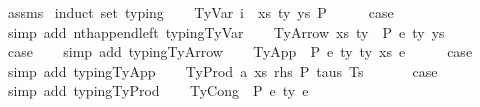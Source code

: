 \begin{isabellebody}
%
\isadelimproof
%
\endisadelimproof
%
\isatagproof
{}\isamarkupfalse%
\ assms\isanewline
{}\isamarkupfalse%
\ {\isacharparenleft}{\kern0pt}induct\ set{\isacharcolon}{\kern0pt}\ typing{\isacharparenright}{\kern0pt}\isanewline
\ \ \isamarkupfalse%
\ {\isacharparenleft}{\kern0pt}TyVar\ i\ {\isasymGamma}\ xs\ ty\ ys\ P{\isacharparenright}{\kern0pt}\isanewline
\ \ \isamarkupfalse%
\ \isamarkupfalse%
\ {\isacharquery}{\kern0pt}case\isanewline
\ \ \isamarkupfalse%
\ {\isacharparenleft}{\kern0pt}simp\ add{\isacharcolon}{\kern0pt}\ nth{\isacharunderscore}{\kern0pt}append{\isacharunderscore}{\kern0pt}left\ typing{\isachardot}{\kern0pt}TyVar{\isacharparenright}{\kern0pt}\isanewline
{}\isamarkupfalse%
\isanewline
\ \ \isamarkupfalse%
\ {\isacharparenleft}{\kern0pt}TyArrow\ xs\ ty{}\ {\isasymGamma}\ P\ e\ ty{}\ ys{\isacharparenright}{\kern0pt}\isanewline
\ \ \isamarkupfalse%
\ \isamarkupfalse%
\ {\isacharquery}{\kern0pt}case\isanewline
\ \ \isamarkupfalse%
\ {\isacharparenleft}{\kern0pt}simp\ add{\isacharcolon}{\kern0pt}\ typing{\isachardot}{\kern0pt}TyArrow{\isacharparenright}{\kern0pt}\isanewline
{}\isamarkupfalse%
\isanewline
\ \ \isamarkupfalse%
\ {\isacharparenleft}{\kern0pt}TyApp\ {\isasymGamma}\ P\ e{}\ ty{}\ ty{}\ xs\ e{}{\isacharparenright}{\kern0pt}\isanewline
\ \ \isamarkupfalse%
\ \isamarkupfalse%
\ {\isacharquery}{\kern0pt}case\isanewline
\ \ \isamarkupfalse%
\ {\isacharparenleft}{\kern0pt}simp\ add{\isacharcolon}{\kern0pt}\ typing{\isachardot}{\kern0pt}TyApp{\isacharparenright}{\kern0pt}\isanewline
{}\isamarkupfalse%
\isanewline
\ \ \isamarkupfalse%
\ {\isacharparenleft}{\kern0pt}TyProd\ a\ xs\ rhs\ P\ taus\ Ts\ {\isasymGamma}{\isacharparenright}{\kern0pt}\isanewline
\ \ \isamarkupfalse%
\ \isamarkupfalse%
\ {\isacharquery}{\kern0pt}case\isanewline
\ \ \isamarkupfalse%
\ {\isacharparenleft}{\kern0pt}simp\ add{\isacharcolon}{\kern0pt}\ typing{\isachardot}{\kern0pt}TyProd{\isacharparenright}{\kern0pt}\isanewline
{}\isamarkupfalse%
\isanewline
\ \ \isamarkupfalse%
\ {\isacharparenleft}{\kern0pt}TyCong\ {\isasymGamma}\ P\ e{}\ ty\ e{}{\isacharparenright}{\kern0pt}\isanewline

\end{isabellebody}

